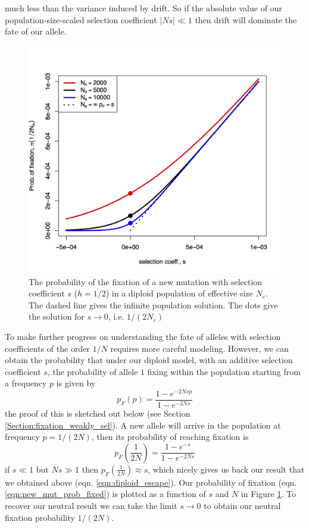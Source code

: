 much less than the variance induced by drift. So if the absolute value
of our population-size-scaled selection coefficient $| Ns| \ll 1$ then
drift will dominate the fate of our allele. \\
\begin{figure}
\begin{center}
\includegraphics[width=0.9 \textwidth]{figures/prob_fix_diffusion.png}
\end{center}
\caption{The probability of the fixation of a new mutation with
  selection coefficient $s$ ($h=1/2$) in a diploid population of effective
  size $N_e$. The dashed line gives the infinite population
  solution. The dots give the solution for $s \rightarrow 0$, i.e. $1/(2N_e)$} \label{fig:prob_fix_diffusion}
\end{figure}

To make further progress on understanding the fate of alleles with
selection coefficients of the order $1/N$ requires more careful
modeling. However, we can obtain the probability that under our diploid model, with an additive selection coefficient $s$, the
probability of allele $1$ fixing within the population starting
from a frequency $p$ is given by
\begin{equation}
p_F(p) = \frac{1-e^{-2Ns p }}{1-e^{-2Ns}} \label{eqn:prob_fixed}
\end{equation}
the proof of this is sketched out below (see Section \ref{Section:fixation_weakly_sel}). A new allele will arrive in the population at frequency $p=1/(2N)$,
then its probability of reaching fixation is
\begin{equation}
p_F \left(\frac{1}{2N} \right) = \frac{1-e^{-s }}{1-e^{-2Ns}} \label{eqn:new_mut_prob_fixed}
\end{equation}
if $s \ll1$ but $Ns \gg 1$ then $p_F(\frac{1}{2N}) \approx s$, which
nicely gives
us back our result that we obtained above
(eqn. \eqref{eqn:diploid_escape}). Our probability of fixation
(eqn. \eqref{eqn:new_mut_prob_fixed}) is plotted as a function of $s$
and $N$ in Figure \ref{fig:prob_fix_diffusion}. To recover our neutral
result we can take the
limit $s \rightarrow 0$ to obtain our neutral fixation
probability $1/(2N)$. \\

